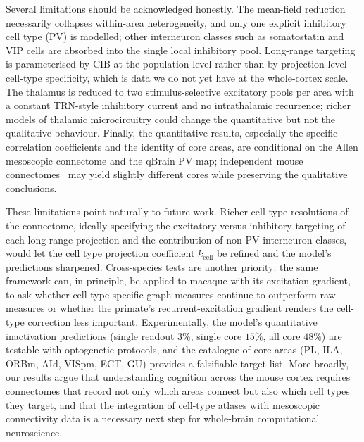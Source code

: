 \documentclass[11pt]{article}
\begin{document}
Several limitations should be acknowledged honestly. The mean-field reduction necessarily collapses within-area heterogeneity, and only one explicit inhibitory cell type (PV) is modelled; other interneuron classes such as somatostatin and VIP cells are absorbed into the single local inhibitory pool. Long-range targeting is parameterised by CIB at the population level rather than by projection-level cell-type specificity, which is data we do not yet have at the whole-cortex scale. The thalamus is reduced to two stimulus-selective excitatory pools per area with a constant TRN-style inhibitory current and no intrathalamic recurrence; richer models of thalamic microcircuitry could change the quantitative but not the qualitative behaviour. Finally, the quantitative results, especially the specific correlation coefficients and the identity of core areas, are conditional on the Allen mesoscopic connectome and the qBrain PV map; independent mouse connectomes~\cite{gamanut2018mouse,knox2018highresolution} may yield slightly different cores while preserving the qualitative conclusions.

These limitations point naturally to future work. Richer cell-type resolutions of the connectome, ideally specifying the excitatory-versus-inhibitory targeting of each long-range projection and the contribution of non-PV interneuron classes, would let the cell type projection coefficient $k_{\text{cell}}$ be refined and the model's predictions sharpened. Cross-species tests are another priority: the same framework can, in principle, be applied to macaque with its excitation gradient, to ask whether cell type-specific graph measures continue to outperform raw measures or whether the primate's recurrent-excitation gradient renders the cell-type correction less important. Experimentally, the model's quantitative inactivation predictions (single readout $3\%$, single core $15\%$, all core $48\%$) are testable with optogenetic protocols, and the catalogue of core areas (PL, ILA, ORBm, AId, VISpm, ECT, GU) provides a falsifiable target list. More broadly, our results argue that understanding cognition across the mouse cortex requires connectomes that record not only which areas connect but also which cell types they target, and that the integration of cell-type atlases with mesoscopic connectivity data is a necessary next step for whole-brain computational neuroscience.
\end{document}
